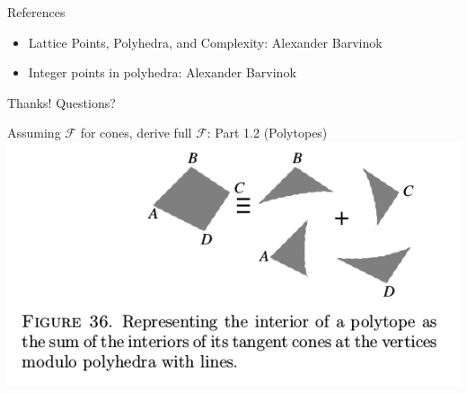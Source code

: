 \documentclass[8pt]{beamer}
\begin{document}
\begin{frame}[label=sec-12]{References}
\begin{itemize}
\item Lattice Points, Polyhedra, and Complexity: Alexander Barvinok
\item Integer points in polyhedra: Alexander Barvinok
\end{itemize}
\end{frame}


\begin{frame}[label=sec-13]{Thanks!}
Questions?
\end{frame}

\begin{frame}[label=sec-14]{Assuming $\mathcal{F}$ for cones, derive full $\mathcal{F}$: Part 1.2 (Polytopes)}
\includegraphics[width=.9\linewidth]{./res/polytope-as-sum-of-tangent-cones.png}
\end{frame}
\end{document}
